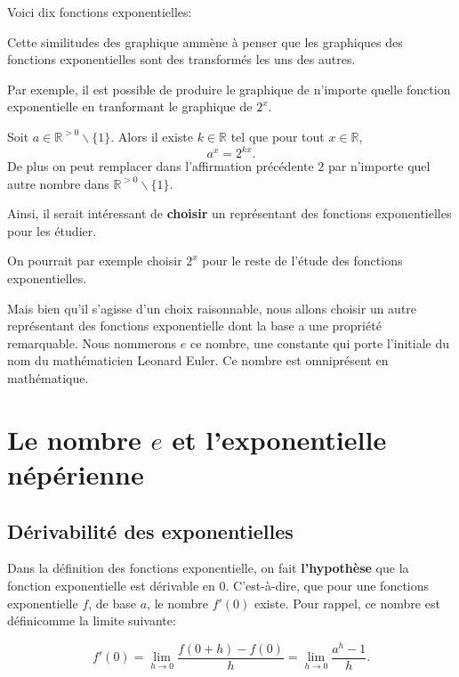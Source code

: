 \documentclass[a4paper,12pt,singlepage]{report}
\newcommand{\IR}{\mathbb{R}}
\begin{document}
Voici dix fonctions exponentielles:

\begin{center}

\end{center}

Cette similitudes des graphique ammène à penser que les graphiques des fonctions
exponentielles sont des transformés les uns des autres.

Par exemple, il est possible de produire le graphique de n'importe quelle
fonction exponentielle en tranformant le graphique de \(2^x\).

\begin{propriete}
Soit \(a\in \IR^{>0}\backslash\{1\}\). Alors il existe \(k\in\IR\) tel que pour tout
\(x\in\IR\),
\[
a^x=2^{kx}.
\]
De plus on peut remplacer dans l'affirmation précédente \(2\) par n'importe quel
autre nombre dans \(\IR^{>0}\backslash\{1\}\).
\end{propriete}

Ainsi, il serait intéressant de \textbf{choisir} un représentant des fonctions
exponentielles pour les étudier.

On pourrait par exemple choisir \(2^x\) pour le reste de l'étude des fonctions
exponentielles.

Mais bien qu'il s'agisse d'un choix raisonnable, nous allons choisir un autre
représentant des fonctions exponentielle dont la base a une propriété
remarquable. Nous nommerons \(e\) ce nombre, une constante qui porte l'initiale du
nom du mathématicien Leonard Euler. Ce nombre est omniprésent en mathématique.

\section{Le nombre \(e\) et l'exponentielle népérienne}
\label{sec:org50b8b1b}
\subsection{Dérivabilité des exponentielles}
\label{sec:orgf5c40c3}

Dans la définition des fonctions exponentielle, on fait \textbf{l'hypothèse} que la
fonction exponentielle est dérivable en \(0\). C'est-à-dire, que pour une
fonctions exponentielle \(f\), de base \(a\), le nombre \(f'(0)\) existe. Pour rappel, ce nombre
est définicomme la limite suivante:

\[
f'(0)=\lim_{h\to 0} \frac{f(0+h)-f(0)}{h}=\lim_{h\to 0} \frac{a^{h}-1}{h}.
\]
\end{document}
